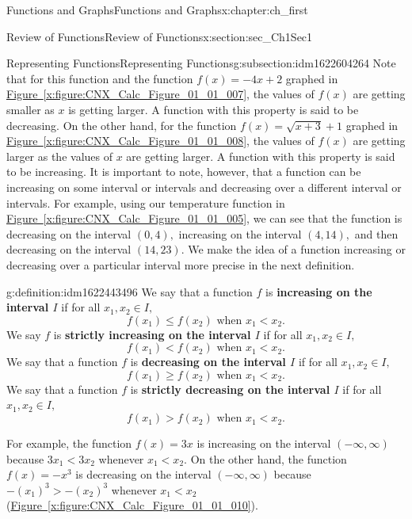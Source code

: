 \documentclass[oneside,10pt,]{book}
\newcommand{\xreffont}{\relax}
\newcommand{\terminology}[1]{\textbf{#1}}
\numberwithin{equation}{section}
\begin{document}
\begin{chapterptx}{Functions and Graphs}{}{Functions and Graphs}{}{}{x:chapter:ch_first}
\begin{sectionptx}{Review of Functions}{}{Review of Functions}{}{}{x:section:sec_Ch1Sec1}
\begin{subsectionptx}{Representing Functions}{}{Representing Functions}{}{}{g:subsection:idm1622604264}
Note that for this function and the function \(f(x)=-4x+2\) graphed in \hyperref[x:figure:CNX_Calc_Figure_01_01_007]{Figure~{\xreffont\ref{x:figure:CNX_Calc_Figure_01_01_007}}}, the values of \(f(x)\) are getting smaller as \(x\) is getting larger. A function with this property is said to be decreasing. On the other hand, for the function \(f(x)=\sqrt{x+3}+1\) graphed in \hyperref[x:figure:CNX_Calc_Figure_01_01_008]{Figure~{\xreffont\ref{x:figure:CNX_Calc_Figure_01_01_008}}}, the values of \(f(x)\) are getting larger as the values of \(x\) are getting larger. A function with this property is said to be increasing. It is important to note, however, that a function can be increasing on some interval or intervals and decreasing over a different interval or intervals. For example, using our temperature function in \hyperref[x:figure:CNX_Calc_Figure_01_01_005]{Figure~{\xreffont\ref{x:figure:CNX_Calc_Figure_01_01_005}}}, we can see that the function is decreasing on the interval \((0,4),\) increasing on the interval \((4,14),\) and then decreasing on the interval \((14,23).\) We make the idea of a function increasing or decreasing over a particular interval more precise in the next definition.%
\begin{definition}{}{g:definition:idm1622443496}%
We say that a function \(f\) is \terminology{increasing on the interval \(I\)} if for all \(x_1,x_2\in I,\)%
%
\begin{equation*}
f(x_1) \leq  f(x_2) \text{ when } x_1 < x_2.
\end{equation*}
We say \(f\) is \terminology{strictly increasing on the interval \(I\)} if for all \(x_1,x_2\in I,\)%
%
\begin{equation*}
f(x_1) < f(x_2) \text{ when } x_1 < x_2.
\end{equation*}
We say that a function \(f\) is \terminology{decreasing on the interval \(I\)} if for all \(x_1,x_2\in I,\)%
%
\begin{equation*}
f(x_1)\geq f(x_2) \text{ when }x_1 < x_2.
\end{equation*}
We say that a function \(f\) is \terminology{strictly decreasing on the interval \(I\)} if for all \(x_1,x_2\in I,\)%
%
\begin{equation*}
f(x_1) > f(x_2) \text{ when }x_1 < x_2.
\end{equation*}
\end{definition}
For example, the function \(f(x)=3x\) is increasing on the interval \((-\infty, \infty)\) because \(3x_1 < 3x_2\) whenever \(x_1 < x_2.\) On the other hand, the function \(f(x)=-x^3\) is decreasing on the interval \((-\infty, \infty)\) because \(-(x_1)^3 > -(x_2)^3\) whenever \(x_1 < x_2\) (\hyperref[x:figure:CNX_Calc_Figure_01_01_010]{Figure~{\xreffont\ref{x:figure:CNX_Calc_Figure_01_01_010}}}).%

\end{subsectionptx}
\end{sectionptx}
\end{chapterptx}
\end{document}
